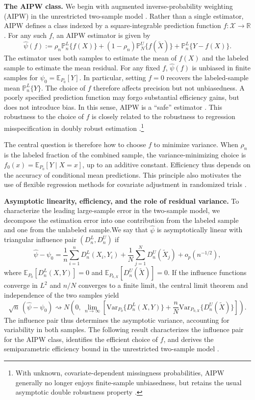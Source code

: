\documentclass{article}
\theoremstyle{plain}
\theoremstyle{definition}
\newcommand{\E}{\mathbb{E}}
\newcommand{\Var}{\mathrm{Var}}
\newcommand{\R}{\mathbb{R}}
\newcommand{\1}{\mathbbm{1}}
\newcommand{\rhon}{\rho_n}
\newcommand{\Pl}{\mathbb{P}^{L}_n}
\newcommand{\Pu}{\mathbb{P}^{U}_N}
\newcommand{\Px}{P_{0,X}}
\begin{document}
\textbf{The AIPW class.}
We begin with augmented inverse-probability weighting (AIPW) in the
unrestricted two-sample model \citep{robins1994estimation}. Rather
than a single estimator, AIPW defines a class indexed by a
square-integrable prediction function $f:\mathcal X\to\R$.
For any such $f$, an AIPW estimator is given by
\begin{equation}
\label{eq:aipw-family}
\widehat\psi(f)
:=
\rhon \Pl\{f(X)\}
+
(1-\rhon)\Pu\{f(\widetilde X)\}
+
\Pl\{Y-f(X)\}.
\end{equation}
The estimator uses both samples to estimate the mean of $f(X)$
and the labeled sample to estimate the mean residual.
For any fixed $f$, $\widehat\psi(f)$ is unbiased in finite samples
for $\psi_0=\E_{P_0}[Y]$. In particular, setting $f=0$ recovers
the labeled-sample mean $\Pl\{Y\}$. The choice of $f$ therefore
affects precision but not unbiasedness. A poorly specified
prediction function may forgo substantial efficiency gains, but
does not introduce bias. In this sense, AIPW is a ``safe''
estimator \citep{xu2025unified}. This robustness to the choice
of $f$ is closely related to the robustness to regression
misspecification in doubly robust estimation
\citep{bang2005doubly}.\footnote{With unknown, covariate-dependent
missingness probabilities, AIPW generally no longer enjoys
finite-sample unbiasedness, but retains the usual asymptotic
double robustness property \citep{seaman2018introduction}.}

The central question is therefore how to choose $f$ to minimize
variance. When $\rhon$ is the labeled fraction of the combined
sample, the variance-minimizing choice is
$f_0(x)=\E_{P_0}[Y\mid X=x]$, up to an additive constant.
Efficiency thus depends on the accuracy of conditional mean
predictions. This principle also motivates the use of flexible
regression methods for covariate adjustment in randomized trials
\citep{moore2009covariate,moore2009increasing,schuler2022increasing,hojbjerre2025powering}.

\textbf{Asymptotic linearity, efficiency, and the role of residual variance.} To characterize the leading large-sample error in the two-sample model, we decompose the estimation error into one contribution from the labeled sample and one from the unlabeled sample.We say that
$\widehat\psi$ is asymptotically linear with triangular influence
pair $(D_n^L,D_n^U)$ if
\[
\widehat\psi-\psi_0
=
\frac{1}{n}\sum_{i=1}^n D_n^L(X_i,Y_i)
+
\frac{1}{N}\sum_{j=1}^N D_n^U(\widetilde X_j)
+
o_p(n^{-1/2}),
\]
where $\E_{P_0}[D_n^L(X,Y)]=0$ and
$\E_{\Px}[D_n^U(\widetilde X)]=0$.
If the influence functions converge in $L^2$ and $n/N$ converges
to a finite limit, the central limit theorem and independence
of the two samples yield
\[
\sqrt n\,(\widehat\psi-\psi_0)
\rightsquigarrow
N\!\left(0,\,
\lim_{n\to\infty}\left[
\Var_{P_0}\{D_n^L(X,Y)\}
+
\frac{n}{N}\Var_{\Px}\{D_n^U(\widetilde X)\}
\right]\right).
\]
The influence pair thus determines the asymptotic variance,
accounting for variability in both samples. The following
result characterizes the influence pair for the AIPW class,
identifies the efficient choice of $f$, and derives the
semiparametric efficiency bound in the unrestricted two-sample
model \citep{bickel1993efficient,robins1994estimation,robins1995semiparametric}.
\end{document}
